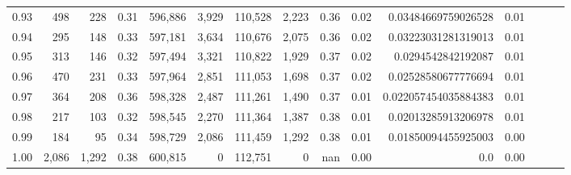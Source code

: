 \begin{tabular}{rrrrrrrrrrrrrrr}
0.93 &     498 &    228 &  0.31 &  596,886 &    3,929 &  110,528 &    2,223 &  0.36 &  0.02 &   0.03484669759026528 &      0.01 \\
0.94 &     295 &    148 &  0.33 &  597,181 &    3,634 &  110,676 &    2,075 &  0.36 &  0.02 &   0.03223031281319013 &      0.01 \\
0.95 &     313 &    146 &  0.32 &  597,494 &    3,321 &  110,822 &    1,929 &  0.37 &  0.02 &    0.0294542842192087 &      0.01 \\
0.96 &     470 &    231 &  0.33 &  597,964 &    2,851 &  111,053 &    1,698 &  0.37 &  0.02 &   0.02528580677776694 &      0.01 \\
0.97 &     364 &    208 &  0.36 &  598,328 &    2,487 &  111,261 &    1,490 &  0.37 &  0.01 &  0.022057454035884383 &      0.01 \\
0.98 &     217 &    103 &  0.32 &  598,545 &    2,270 &  111,364 &    1,387 &  0.38 &  0.01 &   0.02013285913206978 &      0.01 \\
0.99 &     184 &     95 &  0.34 &  598,729 &    2,086 &  111,459 &    1,292 &  0.38 &  0.01 &   0.01850094455925003 &      0.00 \\
1.00 &   2,086 &  1,292 &  0.38 &  600,815 &        0 &  112,751 &        0 &   nan &  0.00 &                   0.0 &      0.00 \\
\bottomrule
\end{tabular}
